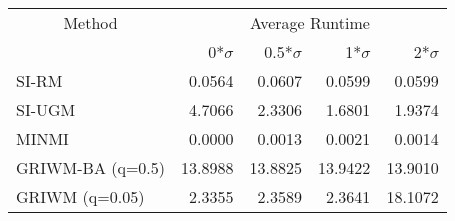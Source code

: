 
\begin{tabular}{lrrrr}
\toprule
\multicolumn{1}{c}{Method} & \multicolumn{4}{c}{Average Runtime} \\
 & 0*$\sigma$ & 0.5*$\sigma$ & 1*$\sigma$ & 2*$\sigma$\\
\midrule
SI-RM & 0.0564 & 0.0607 & 0.0599 & 0.0599\\
SI-UGM & 4.7066 & 2.3306 & 1.6801 & 1.9374\\
MINMI & 0.0000 & 0.0013 & 0.0021 & 0.0014\\
GRIWM-BA (q=0.5) & 13.8988 & 13.8825 & 13.9422 & 13.9010\\
GRIWM (q=0.05) & 2.3355 & 2.3589 & 2.3641 & 18.1072\\
\bottomrule
\end{tabular}
